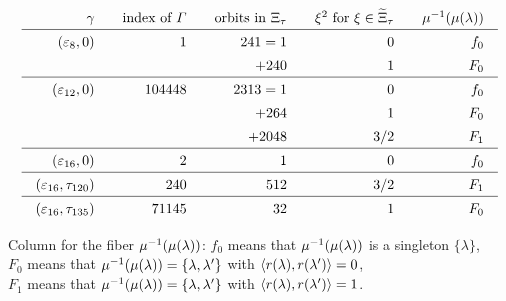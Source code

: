 \documentclass{amsart} %
\begin{document}
\begin{table}
\[
\setlength{\arraycolsep}{10pt}
\renewcommand{\arraystretch}{1.4}
\begin{array}{rrrrr}
\gamma &\textrm{index of $\vGam$} &\textrm{orbits in $\Xitau$} & \xi^2 \textrm{ for } \xi\in \tilXitau&\mu\inv(\mu(\lambda))\\
\hline 
(\vep_8, 0) &1 & 241= 1 & 0 & f_0 \\
   & & +240 & 1 & F_0 \\
\hline 
(\vep_{12}, 0) &104448 & 2313= 1 & 0 & f_0 \\
   & & +264 & 1 & F_0 \\
   & & +2048 & 3/2 & F_1 \\
 \hline 
(\vep_{16}, 0) &2& 1 & 0 & f_0 \\
\hline 
(\vep_{16}, \tau_{120}) &240& 512 & 3/2 & F_1 \\
\hline 
(\vep_{16}, \tau_{135}) &71145 & 32 & 1 & F_0 \\   
\end{array}
\]
\vskip 3mm
%
\parbox{12cm}{
Column for the fiber $\mu^{-1}(\mu(\lambda))$: 
$f_0$ means that $\mu^{-1}(\mu(\lambda))$ is a singleton $\{\lambda\}$,
\\
$ F_0$ means that  $\mu^{-1}(\mu(\lambda))=\{\lambda, \lambda^{\prime}\}$ with $\langle r(\lambda), r(\lambda^{\prime}) \rangle=0$, 
\\
$ F_1$ means that $\mu^{-1}(\mu(\lambda))=\{\lambda, \lambda^{\prime}\}$ with $\langle r(\lambda), r(\lambda^{\prime}) \rangle=1$.
}
%

\vskip 5mm
\caption{Index $[\OG(\Lplus, \PPPplus): \vGam]$ and orbit decomposition of walls}\label{table:Xis}
\end{table}

\end{document}
